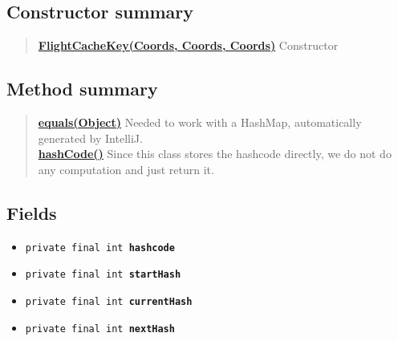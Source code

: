 \documentclass[11pt,a4paper]{report}
\begin{document}
{{{{{{{{{{{{{{\subsection{Constructor summary}{
\begin{verse}
\hyperlink{uk.ac.ed.inf.aqmaps.flightplanning.FlightCacheKey(uk.ac.ed.inf.aqmaps.geometry.Coords, uk.ac.ed.inf.aqmaps.geometry.Coords, uk.ac.ed.inf.aqmaps.geometry.Coords)}{{\bf FlightCacheKey(Coords, Coords, Coords)}} Constructor\\
\end{verse}
}
\subsection{Method summary}{
\begin{verse}
\hyperlink{uk.ac.ed.inf.aqmaps.flightplanning.FlightCacheKey.equals(java.lang.Object)}{{\bf equals(Object)}} Needed to work with a HashMap, automatically generated by IntelliJ.\\
\hyperlink{uk.ac.ed.inf.aqmaps.flightplanning.FlightCacheKey.hashCode()}{{\bf hashCode()}} Since this class stores the hashcode directly, we do not do any computation and just return it.\\
\end{verse}
}
\subsection{Fields}{
\begin{itemize}
\item{
\label{uk.ac.ed.inf.aqmaps.flightplanning.FlightCacheKey.hashcode}\hypertarget{uk.ac.ed.inf.aqmaps.flightplanning.FlightCacheKey.hashcode}{\texttt{private final int\ {\bf  hashcode}}
}
}
\item{
\label{uk.ac.ed.inf.aqmaps.flightplanning.FlightCacheKey.startHash}\hypertarget{uk.ac.ed.inf.aqmaps.flightplanning.FlightCacheKey.startHash}{\texttt{private final int\ {\bf  startHash}}
}
}
\item{
\label{uk.ac.ed.inf.aqmaps.flightplanning.FlightCacheKey.currentHash}\hypertarget{uk.ac.ed.inf.aqmaps.flightplanning.FlightCacheKey.currentHash}{\texttt{private final int\ {\bf  currentHash}}
}
}
\item{
\label{uk.ac.ed.inf.aqmaps.flightplanning.FlightCacheKey.nextHash}\hypertarget{uk.ac.ed.inf.aqmaps.flightplanning.FlightCacheKey.nextHash}{\texttt{private final int\ {\bf  nextHash}}
}
}
\end{itemize}
}
}}}}}}}}}}}}}}
\end{document}
